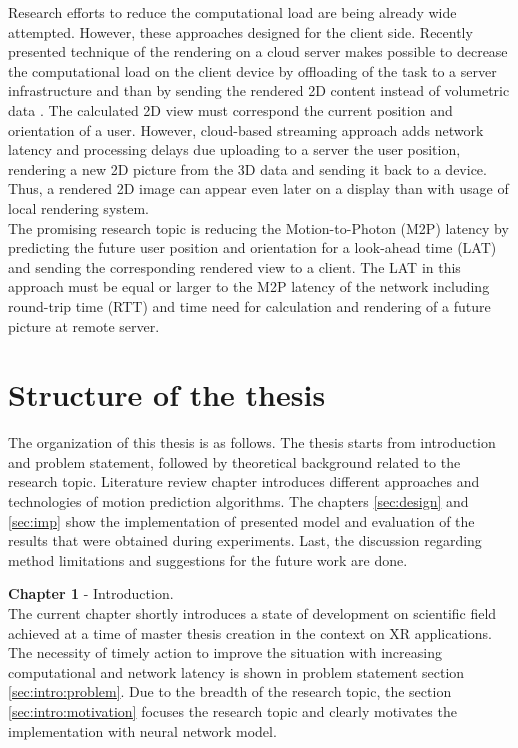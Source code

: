 Research efforts to reduce the computational load are being already wide attempted. However, these approaches designed for the client side. Recently presented technique of the rendering on a cloud server makes possible to decrease the computational load on the client device by offloading of the task to a server infrastructure and than by sending the rendered 2D content instead of volumetric data \cite{serhan_cloud_streaming}. The calculated 2D view must correspond the current position and orientation of a user. However, cloud-based streaming approach adds network latency and processing delays due uploading to a server the user position, rendering a new 2D picture from the 3D data and sending it back to a device. Thus, a rendered 2D image can appear even later on a display than with usage of local rendering system.\\
The promising research topic is reducing the Motion-to-Photon (M2P) latency by predicting the future user position and orientation for a look-ahead time (LAT) and sending the corresponding rendered view to a client. The LAT in this approach must be equal or larger to the M2P latency of the network including round-trip time (RTT) and time need for calculation and rendering of a future picture at remote server.

\section{Structure of the thesis}
\label{sec:intro:structure}
The organization of this thesis is as follows. The thesis starts from introduction and problem statement, followed by theoretical background related to the research topic. Literature review chapter introduces different approaches and  technologies of motion prediction algorithms. The chapters \ref{sec:design} and \ref{sec:imp} show the implementation of presented model and evaluation of the results that were obtained during experiments. Last, the discussion regarding method limitations and suggestions for the future work are done.

\textbf{Chapter 1} - Introduction.\\
The current chapter shortly introduces a state of development on scientific field achieved at a time of master thesis creation in the context on XR applications. The necessity of timely action to improve the situation with increasing computational and network latency is shown in problem statement section \ref{sec:intro:problem}. Due to the breadth of the research topic, the section \ref{sec:intro:motivation} focuses the research topic and clearly motivates the implementation with neural network model. 

